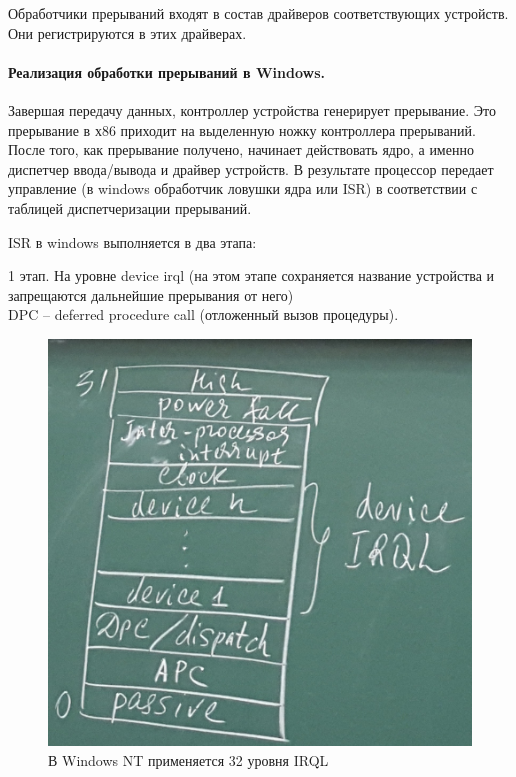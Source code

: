 Обработчики прерываний входят в состав драйверов соответствующих устройств. Они регистрируются в этих драйверах. 

\paragraph{Реализация обработки прерываний в Windows.}

Завершая передачу данных, контроллер устройства генерирует прерывание. Это прерывание в х86 приходит на выделенную ножку контроллера прерываний. После того, как прерывание получено, начинает действовать ядро, а именно диспетчер ввода/вывода и драйвер устройств. В результате процессор передает управление (в windows обработчик ловушки ядра или ISR) в соответствии с таблицей диспетчеризации прерываний. 

ISR в windows выполняется в два этапа: 

1 этап. На уровне device irql (на этом этапе сохраняется название устройства и запрещаются дальнейшие прерывания от него)\\
DPC – deferred procedure call (отложенный вызов процедуры).

\begin{figure}[H]
    \centering
    \includegraphics[width=\textwidth]{pic/6.png}
    \caption{В Windows NT применяется 32 уровня IRQL}
    \label{pic:pic_lec23_1}
\end{figure}

